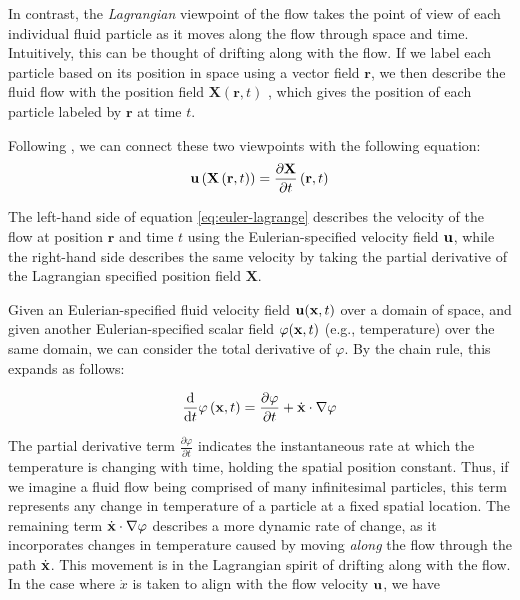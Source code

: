 In contrast, the {\em Lagrangian} viewpoint of the flow takes the point of view of each individual fluid particle as it moves along the flow through space and time. Intuitively, this can be thought of drifting along with the flow. If we label each particle based on its position in space using a vector field $\mathbf{r}$, we then describe the fluid flow with the position field $\mathbf{X}(\mathbf{r}, t)$ , which gives the position of each particle labeled by $\mathbf{r}$ at time $t$.

Following \cite{lamb1932hydrodynamics}, we can connect these two viewpoints with the following equation:
\begin{equation}
\label{eq:euler-lagrange}
\mathbf{u}\left(\mathbf{X}\left(\mathbf{r}, t\right)\right) = \frac{\partial \mathbf{X}}{\partial t}\left(\mathbf{r}, t\right)
\end{equation}

The left-hand side of equation \ref{eq:euler-lagrange} describes the velocity of the flow at position $\mathbf{r}$ and time $t$ using the Eulerian-specified velocity field $\mathbf{u}$, while the right-hand side describes the same velocity by taking the partial derivative of the Lagrangian specified position field $\mathbf{X}$.

Given an Eulerian-specified fluid velocity field $\mathbf{u}(\mathbf{x}, t)$ over a domain of space, and given another Eulerian-specified scalar field $\varphi(\mathbf{x}, t)$ (e.g., temperature) over the same domain, we can consider the total derivative of $\varphi$. By the chain rule, this expands as follows:

\begin{equation}
\frac{\mathrm{d}}{\mathrm{d}t}\varphi\left(\mathbf{x}, t\right) = \frac{\partial \varphi}{\partial t} + \dot{\mathbf{x}} \cdot \nabla \varphi
\end{equation}

The partial derivative term $\frac{\partial \varphi}{\partial t}$ indicates the instantaneous rate at which the temperature is changing with time, holding the spatial position constant. Thus, if we imagine a fluid flow being comprised of many infinitesimal particles, this term represents any change in temperature of a particle at a fixed spatial location. The remaining term $\dot{\mathbf{x}} \cdot \nabla \varphi$ describes a more dynamic rate of change, as it incorporates changes in temperature caused by moving {\em along} the flow through the path $\dot{\mathbf{x}}$. This movement is in the Lagrangian spirit of drifting along with the flow. In the case where $\dot{x}$ is taken to align with the flow velocity $\mathbf{u}$, we have 

